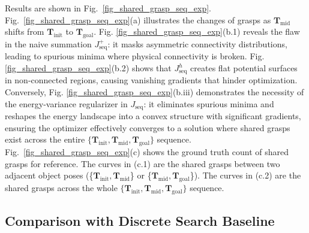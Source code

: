 \documentclass[journal, twoside]{IEEEtran}
\begin{document}
Results are shown in Fig.~\ref{fig_shared_grasp_seq_exp}. Fig.~\ref{fig_shared_grasp_seq_exp}(a) illustrates the changes of grasps as $\mathbf{T}_\mathrm{mid}$ shifts from $\mathbf{T}_\mathrm{init}$ to $\mathbf{T}_\mathrm{goal}$. Fig. \ref{fig_shared_grasp_seq_exp}(b.1) reveals the flaw in the naive summation $J^{+}_\mathrm{seq}$: it masks asymmetric connectivity distributions, leading to spurious minima where physical connectivity is broken. Fig. \ref{fig_shared_grasp_seq_exp}(b.2) shows that $J^{h}_\mathrm{seq}$ creates flat potential surfaces in non-connected regions, causing vanishing gradients that hinder optimization. Conversely, Fig. \ref{fig_shared_grasp_seq_exp}(b.iii) demonstrates the necessity of the energy-variance regularizer in $J_\mathrm{seq}$: it eliminates spurious minima and reshapes the energy landscape into a convex structure with significant gradients, ensuring the optimizer effectively converges to a solution where shared grasps exist across the entire $\{{\mathbf{T}_{\mathrm{init}},\mathbf{T}_{\mathrm{mid}},\mathbf{T}_{\mathrm{goal}}\}}$ sequence. Fig.~\ref{fig_shared_grasp_seq_exp}(c) shows the ground truth count of shared grasps for reference. The curves in (c.1) are the shared grasps between two adjacent object poses (\{$\mathbf{T}_{\mathrm{init}},\mathbf{T}_{\mathrm{mid}}$\} or \{$\mathbf{T}_{\mathrm{mid}},\mathbf{T}_{\mathrm{goal}}$\}). The curves in (c.2) are the shared grasps across the whole $\{{\mathbf{T}_{\mathrm{init}},\mathbf{T}_{\mathrm{mid}},\mathbf{T}_{\mathrm{goal}}\}}$ sequence.

\subsection{Comparison with Discrete Search Baseline}
\label{subsub_one_step_generation_exp}
\end{document}
